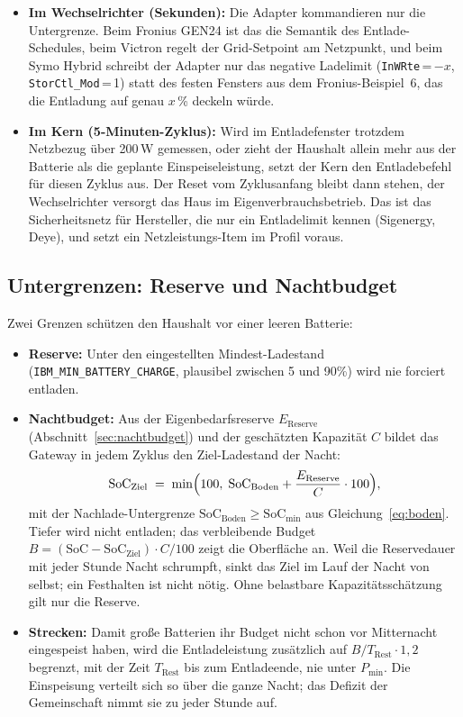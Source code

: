 \documentclass[11pt,a4paper]{article}
\newcommand{\code}[1]{\texttt{#1}}
\begin{document}
\begin{itemize}
  \item \textbf{Im Wechselrichter (Sekunden):} Die Adapter kommandieren nur
    die Untergrenze. Beim Fronius GEN24 ist das die Semantik des
    Entlade-Schedules, beim Victron regelt der Grid-Setpoint am Netzpunkt,
    und beim Symo Hybrid schreibt der Adapter nur das negative Ladelimit
    (\code{InWRte}\,=\,$-x$, \code{StorCtl\_Mod}\,=\,1) statt des festen
    Fensters aus dem Fronius-Beispiel~6, das die Entladung auf genau $x$\,\%
    deckeln würde.
  \item \textbf{Im Kern (5-Minuten-Zyklus):} Wird im Entladefenster trotzdem
    Netzbezug über 200\,W gemessen, oder zieht der Haushalt allein mehr aus
    der Batterie als die geplante Einspeiseleistung, setzt der Kern den
    Entladebefehl für diesen Zyklus aus. Der Reset vom Zyklusanfang bleibt
    dann stehen, der Wechselrichter versorgt das Haus im
    Eigenverbrauchsbetrieb. Das ist das Sicherheitsnetz für Hersteller, die
    nur ein Entladelimit kennen (Sigenergy, Deye), und setzt ein
    Netzleistungs-Item im Profil voraus.
\end{itemize}

\subsection{Untergrenzen: Reserve und Nachtbudget}

Zwei Grenzen schützen den Haushalt vor einer leeren Batterie:

\begin{itemize}
  \item \textbf{Reserve:} Unter den eingestellten Mindest-Ladestand
    (\code{IBM\_MIN\_BATTERY\_CHARGE}, plausibel zwischen 5 und 90\%) wird
    nie forciert entladen.
  \item \textbf{Nachtbudget:} Aus der Eigenbedarfsreserve
    $E_{\text{Reserve}}$ (Abschnitt~\ref{sec:nachtbudget}) und der
    geschätzten Kapazität $C$ bildet das Gateway in jedem Zyklus den
    Ziel-Ladestand der Nacht:
    \begin{equation}
      \text{SoC}_{\text{Ziel}} \;=\; \min\Bigl(100,\;
        \text{SoC}_{\text{Boden}} + \frac{E_{\text{Reserve}}}{C}\cdot 100\Bigr),
      \label{eq:ziel}
    \end{equation}
    mit der Nachlade-Untergrenze $\text{SoC}_{\text{Boden}} \ge
    \text{SoC}_{\min}$ aus Gleichung~\eqref{eq:boden}.
    Tiefer wird nicht entladen; das verbleibende Budget
    $B = (\text{SoC} - \text{SoC}_{\text{Ziel}}) \cdot C / 100$ zeigt die
    Oberfläche an. Weil die Reservedauer mit jeder Stunde Nacht schrumpft,
    sinkt das Ziel im Lauf der Nacht von selbst; ein Festhalten ist nicht
    nötig. Ohne belastbare Kapazitätsschätzung gilt nur die Reserve.
  \item \textbf{Strecken:} Damit große Batterien ihr Budget nicht schon
    vor Mitternacht eingespeist haben, wird die Entladeleistung zusätzlich
    auf $B / T_{\text{Rest}} \cdot 1{,}2$ begrenzt, mit der Zeit
    $T_{\text{Rest}}$ bis zum Entladeende, nie unter $P_{\min}$. Die
    Einspeisung verteilt sich so über die ganze Nacht; das Defizit der
    Gemeinschaft nimmt sie zu jeder Stunde auf.
\end{itemize}
\end{document}
